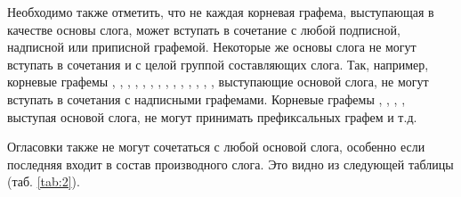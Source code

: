 Необходимо также отметить, что не каждая корневая графема, выступающая в качестве основы слога, может вступать в сочетание с любой подписной, надписной или приписной графемой. Некоторые же основы слога не могут вступать в сочетания и с целой группой составляющих слога. Так, например, корневые графемы , , , , , , , , , , , , , , выступающие основой слога, не могут вступать в сочетания с надписными графемами. Корневые графемы , , , , выступая основой слога, не могут принимать префиксальных графем и т.д.

Огласовки также не могут сочетаться с любой основой слога, особенно если последняя входит в состав производного слога. Это видно из следующей таблицы (таб. \ref{tab:2}). 

